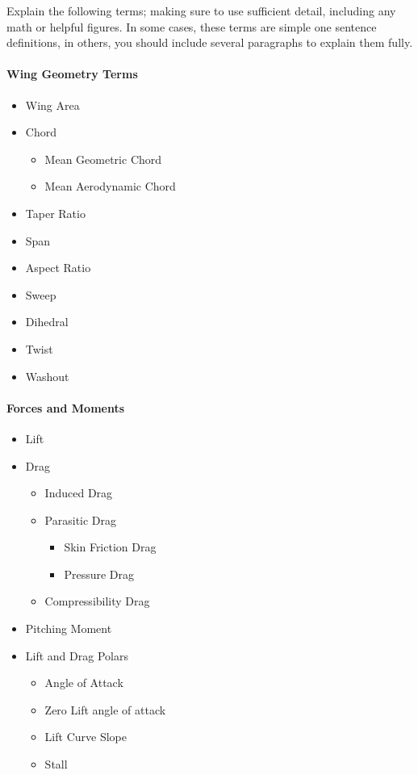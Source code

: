 \documentclass[11pt]{article}
\begin{document}
Explain the following terms; making sure to use sufficient detail, including any math or helpful figures.
In some cases, these terms are simple one sentence definitions, in others, you should include several paragraphs to explain them fully.

\paragraph{Wing Geometry Terms}
\begin{itemize}
	\item Wing Area
	\item Chord
	\begin{itemize}
		\item Mean Geometric Chord
		\item Mean Aerodynamic Chord
	\end{itemize}
	\item Taper Ratio
	\item Span
	\item Aspect Ratio
	\item Sweep
	\item Dihedral
	\item Twist
	\item Washout
\end{itemize}

\paragraph{Forces and Moments}
\begin{itemize}
	\item Lift
	\item Drag
	\begin{itemize}
		\item Induced Drag
		\item Parasitic Drag
		\begin{itemize}
			\item Skin Friction Drag
			\item Pressure Drag
		\end{itemize}
		\item Compressibility Drag
	\end{itemize}
	\item Pitching Moment
	\item Lift and Drag Polars
	\begin{itemize}
		\item Angle of Attack
		\item Zero Lift angle of attack
		\item Lift Curve Slope
		\item Stall
	\end{itemize}
\end{itemize}
\end{document}
